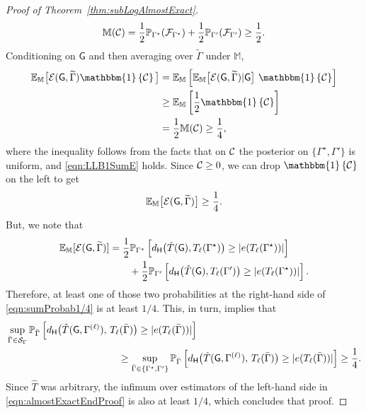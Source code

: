 \documentclass[12pt]{article}
\newcommand{\Ind}{\mathbbm{1}}
\newcommand {\pr} {\mathbb{P}}
\newcommand{\calC}{{\cal C}}
\newcommand{\calE}{{\cal E}}
\newcommand{\calF}{{\cal F}}
\newcommand{\calS}{{\cal S}}
\newcommand{\pp}[1]{\left[#1\right]}
\newcommand{\ppp}[1]{\left\{#1\right\}}
\newcommand{\s}[1]{\mathsf{#1}}
\begin{document}
\begin{proof}[Proof of Theorem~\ref{thm:subLogAlmostExact}]
\begin{align}
\mathbb{M}(\calC)=\frac{1}{2}\pr_{\Gamma^\star}(\calF_{\Gamma^\star})+\frac{1}{2}\pr_{\Gamma'}(\calF_{\Gamma'})\geq\frac{1}{2}.
\end{align}
Conditioning on $\s{G}$ and then averaging over $\widetilde{\Gamma}$ under $\mathbb{M}$,
\begin{align}
\mathbb{E}_{\mathbb{M}}\big[\calE(\s{G},\widetilde{\Gamma})\Ind\ppp{\calC}\big]
&= \mathbb{E}_{\mathbb{M}}\left[\mathbb{E}_{\mathbb{M}}\big[\calE(\s{G},\widetilde{\Gamma})\vert\s{G}\big]\ \Ind\ppp{\calC}\right]\\
&\geq
\mathbb{E}_{\mathbb{M}}\left[\frac{1}{2}\Ind\ppp{\calC}\right]\\
&= \frac{1}{2}\mathbb{M}(\mathcal{C})\geq\frac{1}{4},
\end{align}
where the inequality follows from the facts that on $\calC$ the posterior on $\{\Gamma^\star,\Gamma'\}$ is uniform, and \eqref{eqn:LLB1SumE} holds. Since $\calC\geq 0$, we can drop $\Ind\ppp{\calC}$ on the left to get
\begin{align}
\mathbb{E}_{\mathbb{M}}\big[\calE(\s{G},\widetilde{\Gamma})\big]\geq\frac{1}{4}.
\end{align}
But, we note that
\begin{align}
  \mathbb{E}_{\mathbb{M}}[\calE(\s{G},\widetilde{\Gamma})] &= \frac{1}{2}\pr_{\Gamma^\star}\pp{d_{\s{H}}\big(\hat T(\s{G}),T_\ell(\Gamma^\star)\big)\geq|e(T_\ell(\Gamma^\star))|}\nonumber\\
  &\qquad+\frac{1}{2}\pr_{\Gamma'}\pp{d_{\s{H}}\big(\hat T(\s{G}),T_\ell(\Gamma')\big)\geq|e(T_\ell(\Gamma^\star))|}.\label{eqn:sumProbab1/4}
\end{align}
Therefore, at least one of those two probabilities at the right-hand side of \eqref{eqn:sumProbab1/4} is at least $1/4$. This, in turn, implies that
\begin{align}
    &\sup_{\bar\Gamma\in\calS_\Gamma}
\pr_{\bar\Gamma}\left[d_{\s{H}}\big(\hat T(\s{G},\Gamma^{(\ell)}),\,T_\ell(\bar\Gamma)\big)\geq|e(T_\ell(\bar\Gamma))|\right]\nonumber\\
&\hspace{4cm}\geq\sup_{\bar\Gamma\in\{\Gamma^\star,\Gamma'\}}
\pr_{\bar\Gamma}\left[d_{\s{H}}\big(\hat T(\s{G},\Gamma^{(\ell)}),\,T_\ell(\bar\Gamma)\big)\geq|e(T_\ell(\bar\Gamma))|\right]\geq\frac{1}{4}.\label{eqn:almostExactEndProof}
\end{align}
Since $\hat{T}$ was arbitrary, the infimum over estimators of the left-hand side in \eqref{eqn:almostExactEndProof} is also at least $1/4$, which concludes that proof. 
\end{proof}
\end{document}
